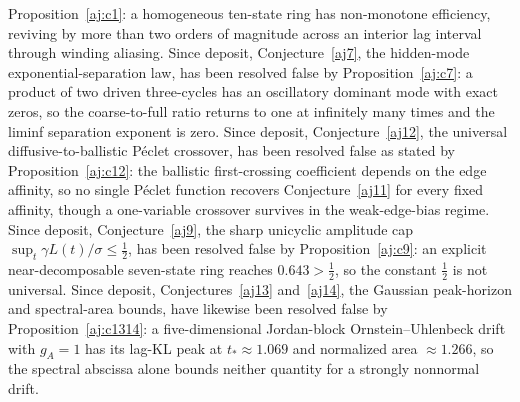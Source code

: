 \documentclass[11pt]{article}
\theoremstyle{definition}
\begin{document}
Proposition~\ref{aj:c1}: a homogeneous ten-state ring has non-monotone efficiency, reviving by more than two orders of magnitude across an interior lag interval through winding aliasing.  Since deposit, Conjecture~\ref{aj7}, the hidden-mode exponential-separation law, has been resolved false by Proposition~\ref{aj:c7}: a product of two driven three-cycles has an oscillatory dominant mode with exact zeros, so the coarse-to-full ratio returns to one at infinitely many times and the liminf separation exponent is zero.  Since deposit, Conjecture~\ref{aj12}, the universal diffusive-to-ballistic P\'eclet crossover, has been resolved false as stated by Proposition~\ref{aj:c12}: the ballistic first-crossing coefficient depends on the edge affinity, so no single P\'eclet function recovers Conjecture~\ref{aj11} for every fixed affinity, though a one-variable crossover survives in the weak-edge-bias regime.  Since deposit, Conjecture~\ref{aj9}, the sharp unicyclic amplitude cap $\sup_t\gamma L(t)/\sigma\le\tfrac12$, has been resolved false by Proposition~\ref{aj:c9}: an explicit near-decomposable seven-state ring reaches $0.643>\tfrac12$, so the constant $\tfrac12$ is not universal.  Since deposit, Conjectures~\ref{aj13} and~\ref{aj14}, the Gaussian peak-horizon and spectral-area bounds, have likewise been resolved false by Proposition~\ref{aj:c1314}: a five-dimensional Jordan-block Ornstein--Uhlenbeck drift with $g_A=1$ has its lag-KL peak at $t_*\approx1.069$ and normalized area $\approx1.266$, so the spectral abscissa alone bounds neither quantity for a strongly nonnormal drift.
\end{document}
